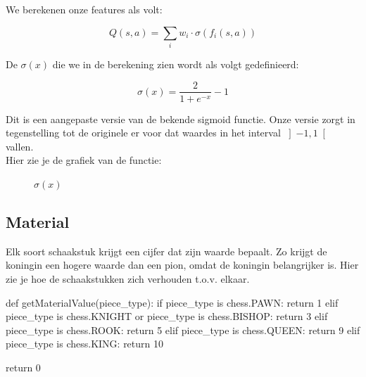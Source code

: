 \documentclass[a4paper,openany]{uantwerpenassignment}
\begin{document}
We berekenen onze features als volt:

$$
Q(s,a) = \sum_{i} w_{i} \cdot \sigma \left( f_i(s, a)\right)
$$

De $\sigma(x)$ die we in de berekening zien wordt als volgt gedefinieerd:

$$
\sigma(x) = \frac{2}{1 + e^{-x}} - 1
$$

Dit is een aangepaste versie van de bekende sigmoid\cite{WSF} functie. Onze versie zorgt in tegenstelling tot de originele er voor dat waardes in het interval $\left]-1,1\right[$ vallen.\\
Hier zie je de grafiek van de functie:

\begin{figure}[h]
    \centering
    \caption{$\sigma(x)$} \label{fig:sigmoid}
\end{figure}



\subsection{Material}
Elk soort schaakstuk krijgt een cijfer dat zijn waarde bepaalt. Zo krijgt de koningin een hogere waarde dan een pion, omdat de koningin belangrijker is. Hier zie je hoe de schaakstukken zich verhouden t.o.v. elkaar.

\begin{python}
def getMaterialValue(piece_type):
    if piece_type is chess.PAWN:
        return 1
    elif piece_type is chess.KNIGHT or piece_type is chess.BISHOP:
        return 3
    elif piece_type is chess.ROOK:
        return 5
    elif piece_type is chess.QUEEN:
        return 9
    elif piece_type is chess.KING:
        return 10

    return 0
\end{python}
\end{document}
